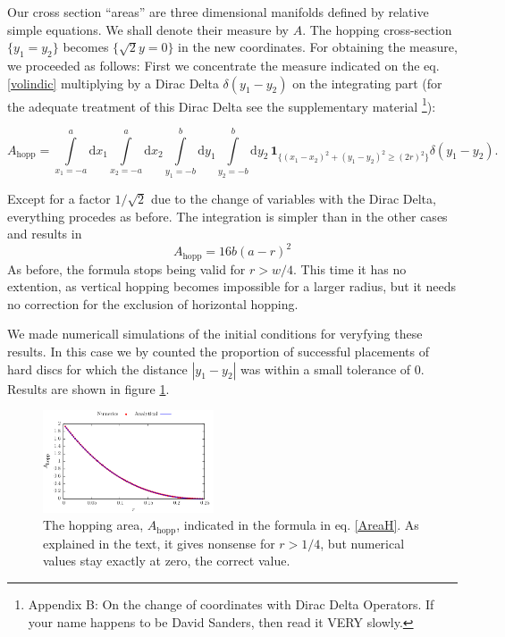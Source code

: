 \documentclass[letterpaper,10pt, jcp, aps]{revtex4-1}
\newcommand{\rd}{\!\mathrm{d}}
\newcommand{\indicator}[1]{\mathbf{1}_{ \{   #1 \} } }
\begin{document}
Our cross section ``areas'' are three dimensional manifolds
defined by relative simple equations. We shall denote their
measure by $A$.
The hopping cross-section 
$ \{y_1 = y_2\}$ becomes 
$\{ \sqrt{2}y=0 \}$ in the new coordinates.
For obtaining the measure,
we proceeded as follows:
First we concentrate the measure indicated on the eq. \ref{volindic}
multiplying by a Dirac Delta $\delta(y_1-y_2)$ on the integrating part
(for the adequate treatment of this Dirac Delta see the supplementary 
material \footnote{Appendix B: On the change of coordinates with Dirac Delta 
Operators. If your name happens to be David Sanders, then read it VERY slowly.}):
\begin{widetext}
\begin{equation}
 A_\text{hopp} = \int\limits_{x_1 = -a}^a \rd x_1 \int\limits_{x_2 = -a}^a \rd x_2 
\int\limits_{y_1 = -b}^b \rd y_1 \int\limits_{y_2 = -b}^b \rd y_2 \, \indicator{ (x_1-x_2)^2 + (y_1-y_2)^2 \ge (2r)^2 } \delta(y_1-y_2).
\end{equation}
\end{widetext}
Except for a factor $1/\sqrt{2}$ due to the change of variables
with the Dirac Delta, everything procedes as before. The integration is
simpler than in the other cases and results in 
\begin{equation}
 A_\text{hopp}  =  16 b(a-r)^2
\end{equation}
As before, the formula stops being valid for $r>w/4$. This time it has
no extention, as vertical hopping becomes impossible for a larger radius,
but it needs no correction for the exclusion of horizontal hopping. 

We made numericall simulations of the initial conditions for
veryfying these results. In this case we 
by counted the proportion of successful placements of hard discs 
for which the distance 
$|y_1 - y_2|$ was within a small tolerance of $0$. 
Results are shown in figure \ref{AreaHopp01}.

\begin{figure}[h]
\centering
\includegraphics[width=0.45\textwidth]{./FigurasPerfectas/AreaHop02.pdf}
\caption{The hopping area, $A_\text{hopp}$, 
  indicated in the formula in eq. \ref{AreaH}. As explained
in the text, it gives nonsense for $r>1/4$, but numerical values stay
exactly at zero, the correct value. } 
\label{AreaHopp01}
\end{figure}
\end{document}
